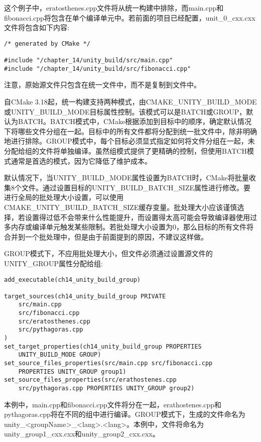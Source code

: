 这个例子中，eratosthenes.cpp文件将从统一构建中排除，而main.cpp和fibonacci.cpp将包含在单个编译单元中。若前面的项目已经配置，unit\_0\_cxx.cxx文件将包含如下内容:

\begin{lstlisting}[style=styleCXX]
/* generated by CMake */

#include "/chapter_14/unity_build/src/main.cpp"
#include "/chapter_14/unity_build/src/fibonacci.cpp"
\end{lstlisting}

注意，原始源文件只包含在统一文件中，而不是复制到文件中。

自CMake 3.18起，统一构建支持两种模式，由CMAKE\_UNITY\_BUILD\_MODE或UNITY\_BUILD\_MODE目标属性控制。该模式可以是BATCH或GROUP，默认为BATCH。BATCH模式中，CMake根据添加到目标中的顺序，确定默认情况下将哪些文件分组在一起。目标中的所有文件都将分配到统一批文件中，除非明确地进行排除。GROUP模式中，每个目标必须显式指定如何将文件分组在一起，未分配给组的文件将单独编译。虽然组模式提供了更精确的控制，但使用BATCH模式通常是首选的模式，因为它降低了维护成本。

默认情况下，当UNITY\_BUILD\_MODE属性设置为BATCH时，CMake将批量收集8个文件。通过设置目标的UNITY\_BUILD\_BATCH\_SIZE属性进行修改。要进行全局的批处理大小设置，可以使用CMAKE\_UNITY\_BUILD\_BATCH\_SIZE缓存变量。批处理大小应该谨慎选择，若设置得过低不会带来什么性能提升，而设置得太高可能会导致编译器使用过多内存或编译单元触发某些限制。若批处理大小设置为0，那么目标的所有文件将合并到一个批处理中，但是由于前面提到的原因，不建议这样做。

GROUP模式下，不应用批处理大小，但文件必须通过设置源文件的UNITY\_GROUP属性分配给组:

\begin{lstlisting}[style=styleCMake]
add_executable(ch14_unity_build_group)

target_sources(ch14_unity_build_group PRIVATE
	src/main.cpp
	src/fibonacci.cpp
	src/eratosthenes.cpp
	src/pythagoras.cpp
)
set_target_properties(ch14_unity_build_group PROPERTIES
	UNITY_BUILD_MODE GROUP)
set_source_files_properties(src/main.cpp src/fibonacci.cpp
	PROPERTIES UNITY_GROUP group1)
set_source_files_properties(src/erathostenes.cpp
	src/pythagoras.cpp PROPERTIES UNITY_GROUP group2)
\end{lstlisting}

本例中，main.cpp和fibonacci.cpp文件将分在一起，erathostenes.cpp和pythagoras.cpp将在不同的组中进行编译。GROUP模式下，生成的文件命名为unity\_<groupName>\_<lang>.<lang>。本例中，文件将命名为unity\_group1\_cxx.cxx和unity\_group2\_cxx.cxx。

